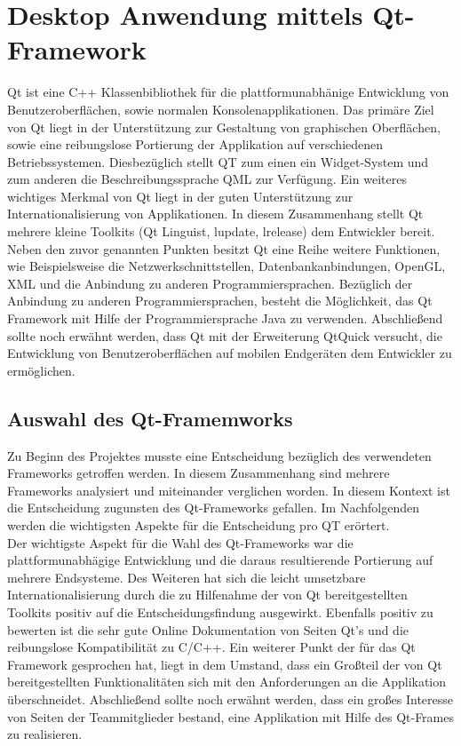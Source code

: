 \newpage
\section{Desktop Anwendung mittels Qt-Framework}

Qt ist eine C++ Klassenbibliothek für die plattformunabhänige Entwicklung von Benutzeroberflächen, sowie normalen Konsolenapplikationen. Das primäre Ziel von Qt liegt in der Unterstützung zur Gestaltung von graphischen Oberflächen, sowie eine reibungslose Portierung der Applikation auf verschiedenen Betriebssystemen. Diesbezüglich stellt QT zum einen ein Widget-System und zum anderen die Beschreibungssprache QML zur Verfügung. Ein weiteres wichtiges Merkmal von Qt liegt in der guten Unterstützung zur Internationalisierung von Applikationen. In diesem Zusammenhang stellt Qt mehrere kleine Toolkits (Qt Linguist, lupdate, lrelease) dem Entwickler bereit. Neben den zuvor genannten Punkten besitzt Qt eine Reihe weitere Funktionen, wie Beispielsweise die Netzwerkschnittstellen, Datenbankanbindungen, OpenGL, XML und die Anbindung zu anderen Programmiersprachen. Bezüglich der Anbindung zu anderen Programmiersprachen, besteht die Möglichkeit, das Qt Framework mit Hilfe der Programmiersprache Java zu verwenden. Abschließend sollte noch erwähnt werden, dass Qt mit der Erweiterung QtQuick versucht, die Entwicklung von Benutzeroberflächen auf mobilen Endgeräten dem Entwickler zu ermöglichen.

\subsection{Auswahl des Qt-Framemworks}

Zu Beginn des Projektes musste eine Entscheidung bezüglich des verwendeten Frameworks getroffen werden. In diesem Zusammenhang sind mehrere Frameworks analysiert und miteinander verglichen worden. In diesem Kontext ist die Entscheidung zugunsten des Qt-Frameworks gefallen. Im Nachfolgenden werden die wichtigsten Aspekte für die Entscheidung pro QT erörtert. \\

Der wichtigste Aspekt für die Wahl des Qt-Frameworks war die plattformunabhägige Entwicklung und die daraus resultierende Portierung auf mehrere Endsysteme. Des Weiteren hat sich die leicht umsetzbare Internationalisierung durch die zu Hilfenahme der von Qt bereitgestellten Toolkits positiv auf die Entscheidungsfindung ausgewirkt. Ebenfalls positiv zu bewerten ist die sehr gute Online Dokumentation von Seiten Qt’s und die reibungslose Kompatibilität zu C/C++. Ein weiterer Punkt der für das Qt Framework gesprochen hat, liegt in dem Umstand, dass ein Großteil der von Qt bereitgestellten Funktionalitäten sich mit den Anforderungen an die Applikation überschneidet. Abschließend sollte noch erwähnt werden, dass ein großes Interesse von Seiten der Teammitglieder bestand, eine Applikation mit Hilfe des Qt-Frames zu realisieren.


